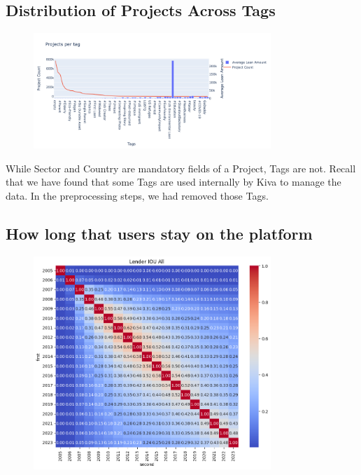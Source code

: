 \subsection{Distribution of Projects Across Tags}

\begin{figure}[H]
	\centering
	\includegraphics[width=0.8\textwidth]{images/project-vs-tag.png}
	\caption{}
	\label{fig:project-vs-tag}
\end{figure}



While Sector and Country are mandatory fields of a Project, Tags are not.
Recall that we have found that some Tags are used internally by Kiva to manage the data.
In the preprocessing steps, we had removed those Tags.


\subsection{How long that users stay on the platform}


\begin{figure}[H]
	\centering
	\includegraphics[width=0.8\textwidth]{images/active-pairwise.png}
	\caption{}
	\label{fig:active-pairwise}
\end{figure}


